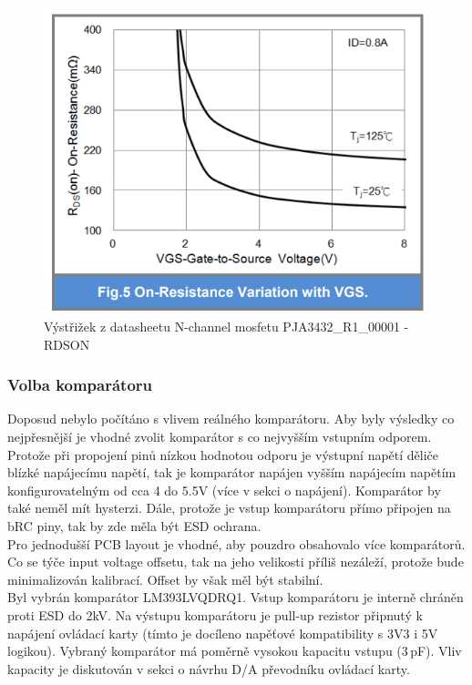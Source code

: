 \begin{figure}[ht!]
    \centering
    \includegraphics[height = 0.25\textheight]{obrazky/Nmosfet_datasheet.png}
    \caption{Výstřižek z datasheetu N-channel mosfetu PJA3432\_R1\_00001 - RDSON\cite{NMOS_datasheet}}
    \label{fig:Výstřižek z datasheetu N-channel mosfetu}
\end{figure}

\subsubsection{Volba komparátoru}
Doposud nebylo počítáno s vlivem reálného komparátoru.
Aby byly výsledky co nejpřesnější je vhodné zvolit komparátor s co nejvyšším vstupním odporem.
Protože při propojení pinů nízkou hodnotou odporu je výstupní napětí děliče blízké napájecímu napětí, tak je komparátor
napájen vyšším napájecím napětím konfigurovatelným od cca 4 do 5.5V (více v sekci o napájení).
Komparátor by také neměl mít hysterzi. Dále, protože je vstup komparátoru přímo připojen
na bRC piny, tak by zde měla být ESD ochrana.\\

Pro jednodušší PCB layout je vhodné, aby pouzdro obsahovalo více komparátorů.
Co se týče input voltage offsetu, tak na jeho velikosti
příliš nezáleží, protože bude minimalizován kalibrací. Offset by však měl být stabilní.\\

Byl vybrán komparátor LM393LVQDRQ1. Vstup komparátoru je interně chráněn proti ESD do 2kV.
Na výstupu komparátoru je pull-up rezistor připnutý k napájení
ovládací karty (tímto je docíleno napěťové kompatibility s 3V3 i 5V logikou).
Vybraný komparátor má poměrně vysokou kapacitu vstupu (3\,pF).
Vliv kapacity je diskutován v sekci o návrhu D/A převodníku ovládací karty\cite{comp_datasheet}.


